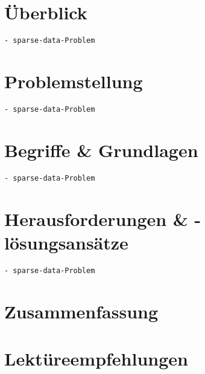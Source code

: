 \documentclass[11pt,twoside]{mparticle}
\begin{document}
\section{Überblick}
\label{ueberblick}
\begin{verbatim}
- sparse-data-Problem
\end{verbatim}


\section{Problemstellung}
\label{problemstellung}
\begin{verbatim}
- sparse-data-Problem
\end{verbatim}


\section{Begriffe \& Grundlagen}
\label{grundlagen}
\begin{verbatim}
- sparse-data-Problem
\end{verbatim}

\section{Herausforderungen \& -lösungsansätze}
\label{herausforderungen}
\begin{verbatim}
- sparse-data-Problem
\end{verbatim}

\section{Zusammenfassung}
\label{zusammenfassung}

\section{Lektüreempfehlungen}
\label{lektuere}



\end{document}
